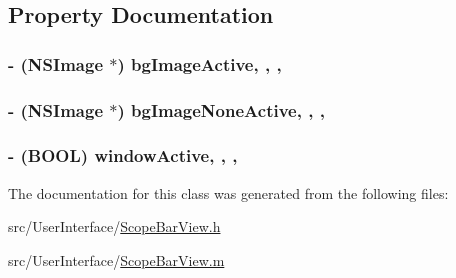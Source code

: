 \subsection{Property Documentation}
\hypertarget{interface_scope_bar_view_afdbaea23155cd6f01256782526b67731}{
\subsubsection[{bg\-Image\-Active}]{\setlength{\rightskip}{0pt plus 5cm}-\/ (N\-S\-Image $\ast$) bg\-Image\-Active\hspace{0.3cm}{\ttfamily [read]}, {\ttfamily [write]}, {\ttfamily [atomic]}, {\ttfamily [retain]}}}\label{interface_scope_bar_view_afdbaea23155cd6f01256782526b67731}
\hypertarget{interface_scope_bar_view_aa8318ae34c4eeeede8e75b2c2ac467d3}{
\subsubsection[{bg\-Image\-None\-Active}]{\setlength{\rightskip}{0pt plus 5cm}-\/ (N\-S\-Image $\ast$) bg\-Image\-None\-Active\hspace{0.3cm}{\ttfamily [read]}, {\ttfamily [write]}, {\ttfamily [atomic]}, {\ttfamily [retain]}}}\label{interface_scope_bar_view_aa8318ae34c4eeeede8e75b2c2ac467d3}
\hypertarget{interface_scope_bar_view_aa5330c688cea62c644ac5eb9ee4b0443}{
\subsubsection[{window\-Active}]{\setlength{\rightskip}{0pt plus 5cm}-\/ (B\-O\-O\-L) window\-Active\hspace{0.3cm}{\ttfamily [read]}, {\ttfamily [write]}, {\ttfamily [atomic]}, {\ttfamily [assign]}}}\label{interface_scope_bar_view_aa5330c688cea62c644ac5eb9ee4b0443}


The documentation for this class was generated from the following files\-:\begin{DoxyCompactItemize}
\item 
src/\-User\-Interface/\hyperlink{_scope_bar_view_8h}{Scope\-Bar\-View.\-h}\item 
src/\-User\-Interface/\hyperlink{_scope_bar_view_8m}{Scope\-Bar\-View.\-m}\end{DoxyCompactItemize}
